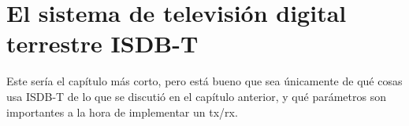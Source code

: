 \chapter{El sistema de televisión digital terrestre ISDB-T}

Este sería el capítulo más corto, pero está bueno que sea únicamente de qué cosas usa ISDB-T de lo que se discutió en el capítulo anterior, y qué parámetros son importantes a la hora de implementar un tx/rx. 